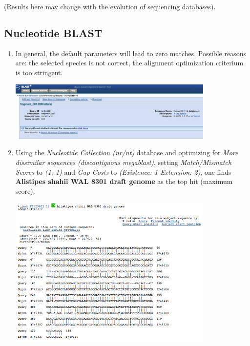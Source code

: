 \documentclass[a4paper,11pt]{article}
\begin{document}
(Results here may change with the evolution of sequencing databases).

\subsection{Nucleotide BLAST}

\begin{enumerate}
\item In general, the default parameters will lead to zero matches. Possible reasons are: the selected species is not correct, the alignment optimization criterium is too stringent.

\vspace{0.5cm}
\begin{center}
\includegraphics[width=0.8\textwidth]{blastn1.png}
\end{center}
\vspace{0.5cm}

\item Using the \textit{Nucleotide Collection (nr/nt)} database and optimizing for \textit{More dissimilar sequences
(discontiguous megablast)}, setting \textit{Match/Mismatch Scores} to \textit{(1,-1)} and \textit{Gap Costs} to \textit{(Existence: 1 Extension: 2)}, one finds \textbf{Alistipes shahii WAL 8301 draft genome} as the top hit (maximum score).

\vspace{0.5cm}
\begin{center}
\includegraphics[width=0.8\textwidth]{blastn2.png}
\end{center}
\vspace{0.5cm}


\end{enumerate}
\end{document}

